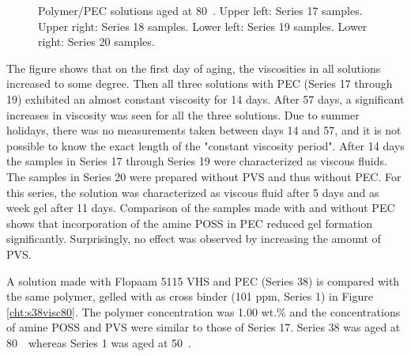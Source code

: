 \begin{figure}
    \centering
    \caption{Polymer/PEC solutions aged at 80~\celsius. Upper left: Series 17 samples. Upper right: Series 18 samples. Lower left: Series 19 samples. Lower right: Series 20 samples.}
    \label{cht:s17visc80}
\end{figure}

The figure shows that on the first day of aging, the viscosities in all solutions increased to some degree. Then all three solutions with PEC (Series 17 through 19) exhibited an almost constant viscosity for 14 days. After 57 days, a significant increases in viscosity was seen for all the three solutions. Due to summer holidays, there was no measurements taken between days 14 and 57, and it is not possible to know the exact length of the "constant viscosity period". After 14 days the samples in Series 17 through Series 19 were characterized as viscous fluids. The samples in Series 20 were prepared without PVS and thus without PEC. For this series, the solution was characterized as viscous fluid after 5 days and as week gel after 11 days. Comparison of the samples made with and without PEC shows that incorporation of the amine POSS in PEC reduced gel formation significantly. Surprisingly, no effect was observed by increasing the amount of PVS.

A solution made with Flopaam 5115 VHS and PEC (Series 38) is compared with the same polymer, gelled with  as cross binder (101 ppm, Series 1) in Figure \ref{cht:s38visc80}. The polymer concentration was 1.00 wt.\% and the concentrations of amine POSS and PVS were similar to those of Series 17. Series 38 was aged at 80~\celsius~whereas Series 1 was aged at 50~\celsius.

